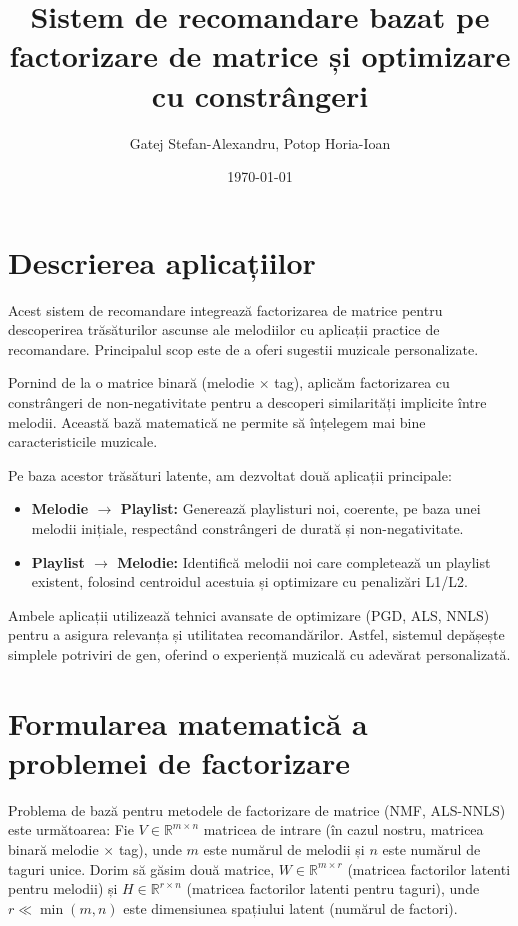 \documentclass[12pt,a4paper]{article}
\title{Sistem de recomandare bazat pe factorizare de matrice și optimizare cu constrângeri}
\author{Gatej Stefan-Alexandru, Potop Horia-Ioan}
\date{\today} %
\begin{document}
	\maketitle
	\tableofcontents
	\newpage

	\section{Descrierea aplicațiilor}

	Acest sistem de recomandare integrează factorizarea de matrice pentru descoperirea trăsăturilor ascunse ale melodiilor cu aplicații practice de recomandare. Principalul scop este de a oferi sugestii muzicale personalizate.

	Pornind de la o matrice binară (melodie $\times$ tag), aplicăm factorizarea cu constrângeri de non-negativitate pentru a descoperi similarități implicite între melodii. Această bază matematică ne permite să înțelegem mai bine caracteristicile muzicale.

	Pe baza acestor trăsături latente, am dezvoltat două aplicații principale:
	\begin{itemize}
		\item \textbf{Melodie $\rightarrow$ Playlist:} Generează playlisturi noi, coerente, pe baza unei melodii inițiale, respectând constrângeri de durată și non-negativitate.
		\item \textbf{Playlist $\rightarrow$ Melodie:} Identifică melodii noi care completează un playlist existent, folosind centroidul acestuia și optimizare cu penalizări L1/L2.
	\end{itemize}
	Ambele aplicații utilizează tehnici avansate de optimizare (PGD, ALS, NNLS) pentru a asigura relevanța și utilitatea recomandărilor. Astfel, sistemul depășește simplele potriviri de gen, oferind o experiență muzicală cu adevărat personalizată.
	\section{Formularea matematică a problemei de factorizare}

	Problema de bază pentru metodele de factorizare de matrice (NMF, ALS-NNLS) este următoarea:
	Fie $V \in \mathbb{R}^{m \times n}$ matricea de intrare (în cazul nostru, matricea binară melodie $\times$ tag), unde $m$ este numărul de melodii și $n$ este numărul de taguri unice. Dorim să găsim două matrice, $W \in \mathbb{R}^{m \times r}$ (matricea factorilor latenti pentru melodii) și $H \in \mathbb{R}^{r \times n}$ (matricea factorilor latenti pentru taguri), unde $r \ll \min(m,n)$ este dimensiunea spațiului latent (numărul de factori).
\end{document}
